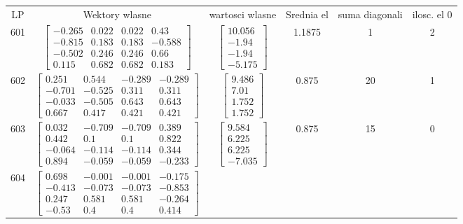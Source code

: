 \documentclass[a4paper,12pt]{article}
\begin{document}
\bgroup {} \vspace{0.2in} \begin{tabular}{c c c c c c}
LP &Wektory wlasne & wartosci wlasne & Srednia el & suma diagonali & ilosc. el 0\\
601
&
$\begin{bmatrix} -0.265 & 0.022 & 0.022 & 0.43 \\ -0.815 & 0.183 & 0.183 & -0.588 \\ -0.502 & 0.246 & 0.246 & 0.66 \\ 0.115 & 0.682 & 0.682 & 0.183 \end{bmatrix}$
&
$\begin{bmatrix} 10.056 \\ -1.94 \\ -1.94 \\ -5.175 \end{bmatrix}$
&
1.1875
&
1
&
2
\\
602
&
$\begin{bmatrix} 0.251 & 0.544 & -0.289 & -0.289 \\ -0.701 & -0.525 & 0.311 & 0.311 \\ -0.033 & -0.505 & 0.643 & 0.643 \\ 0.667 & 0.417 & 0.421 & 0.421 \end{bmatrix}$
&
$\begin{bmatrix} 9.486 \\ 7.01 \\ 1.752 \\ 1.752 \end{bmatrix}$
&
0.875
&
20
&
1
\\
603
&
$\begin{bmatrix} 0.032 & -0.709 & -0.709 & 0.389 \\ 0.442 & 0.1 & 0.1 & 0.822 \\ -0.064 & -0.114 & -0.114 & 0.344 \\ 0.894 & -0.059 & -0.059 & -0.233 \end{bmatrix}$
&
$\begin{bmatrix} 9.584 \\ 6.225 \\ 6.225 \\ -7.035 \end{bmatrix}$
&
0.875
&
15
&
0
\\
604
&
$\begin{bmatrix} 0.698 & -0.001 & -0.001 & -0.175 \\ -0.413 & -0.073 & -0.073 & -0.853 \\ 0.247 & 0.581 & 0.581 & -0.264 \\ -0.53 & 0.4 & 0.4 & 0.414 \end{bmatrix}$

\end{tabular}
\end{document}
